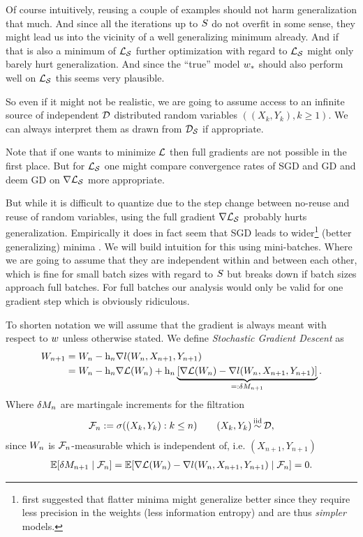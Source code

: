 Of course intuitively, reusing a couple of examples should not harm
generalization that much. And since all the iterations up to \(S\)
do not overfit in some sense, they might lead us into the vicinity of a well
generalizing minimum already. And if that is also a minimum of \(\mathcal{L}_{\mathcal{S}}\)
further optimization with regard to \(\mathcal{L}_{\mathcal{S}}\) might only barely hurt
generalization. And since the ``true'' model \(w_*\) should also perform
well on \(\mathcal{L}_{\mathcal{S}}\) this seems very plausible.

So even if it might not be realistic, we are going to assume access to an infinite
source of independent \(\mathcal{D}\) distributed random variables \(((X_k,Y_k), k\ge 1)\).
We can always interpret them as drawn from \(\mathcal{D}_{\mathcal{S}}\) if appropriate.

Note that if one wants to minimize \(\mathcal{L}\) then full gradients are not possible in
the first place. But for \(\mathcal{L}_{\mathcal{S}}\) one might compare convergence rates
of SGD and GD and deem GD on \(\nabla\mathcal{L}_{\mathcal{S}}\) more appropriate.

But while it
is difficult to quantize due to the step change between no-reuse and reuse of
random variables, using the full gradient \(\nabla\mathcal{L}_{\mathcal{S}}\) probably hurts
generalization. Empirically it does in fact
seem that SGD leads to wider\footnote{
\textcite{hochreiterFlatMinima1997} first suggested that flatter minima might
	generalize better since they require less precision in the weights (less
	information entropy) and are thus \emph{simpler} models.
}
(better generalizing) minima \parencite{liVisualizingLossLandscape2018}.
We will build intuition for this using mini-batches. Where we
are going to assume that they are independent within and between each other,
which is fine for small batch sizes with regard to \(S\) but breaks
down if batch sizes approach full batches. For full batches our analysis would
only be valid for one gradient step which is obviously ridiculous.

To shorten notation we will assume that the gradient is always meant
with respect to \(w\) unless otherwise stated.
We define \emph{Stochastic Gradient Descent} as
%
\begin{align*}
	W_{n+1}
	&= W_n - \text{h}_n\nabla l(W_n, X_{n+1},Y_{n+1})\\
	&= W_n - \text{h}_n\nabla\mathcal{L}(W_n)
	+ \text{h}_n\underbrace{
		[\nabla\mathcal{L}(W_n) - \nabla l(W_n, X_{n+1}, Y_{n+1})]
	}_{=:\delta M_{n+1}}.
\end{align*}
Where \(\delta M_n\) are martingale increments for the filtration
\begin{align*}
	\filtration_n :=\sigma((X_k, Y_k): k\le n )
	\qquad (X_k,Y_k)\stackrel{\text{iid}}{\sim}\dist,
\end{align*}
since \(W_n\) is \(\mathcal{F}_n\)-measurable which is independent of, i.e.
\((X_{n+1},Y_{n+1})\)
\begin{align}\label{eq: conditional independence of martingale increments}
	\mathbb{E}[\delta M_{n+1}\mid \mathcal{F}_n]
	= \mathbb{E}[\nabla\mathcal{L}(W_n) - \nabla l(W_n, X_{n+1}, Y_{n+1})\mid \mathcal{F}_n]
	= 0.
\end{align}
%
